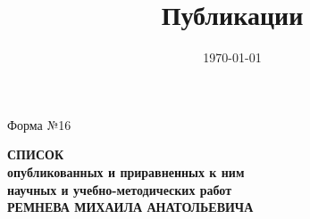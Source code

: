 \documentclass[10pt, a4paper]{article}
\title{Публикации}
\author{}
\date{\today}
\begin{document}

\begin{flushright}Форма №16\end{flushright}

\begin{center}
    \textbf{СПИСОК}\\
    \textbf{опубликованных и приравненных к ним}\\
    \textbf{научных и учебно-методических работ}\\
    \vspace{1em}
    \textbf{РЕМНЕВА МИХАИЛА АНАТОЛЬЕВИЧА}
\end{center}
\end{document}
